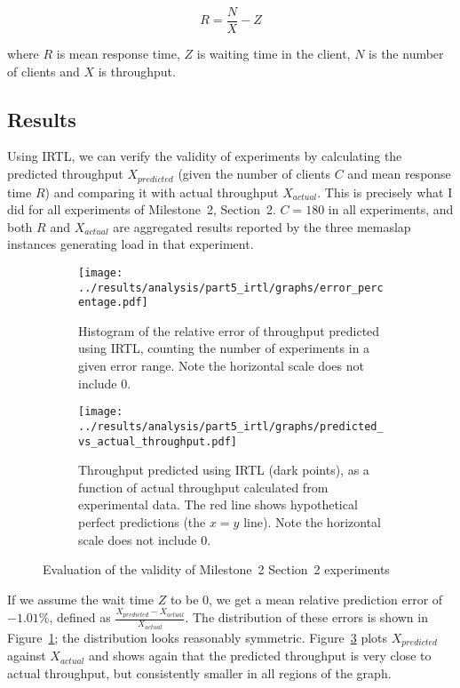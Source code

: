 \documentclass[11pt]{article}
\begin{document}
$$R = \frac{N}{X} - Z$$

where $R$ is mean response time, $Z$ is waiting time in the client, $N$ is the number of clients and $X$ is throughput.

\subsection{Results}

Using IRTL, we can verify the validity of experiments by calculating the predicted throughput $X_{predicted}$ (given the number of clients $C$ and mean response time $R$) and comparing it with actual throughput $X_{actual}$. This is precisely what I did for all experiments of Milestone~2, Section~2. $C=180$ in all experiments, and both $R$ and $X_{actual}$ are aggregated results reported by the three memaslap instances generating load in that experiment.

\begin{figure}[h]
\centering
\begin{subfigure}[t]{0.49\textwidth}
\texttt{[image: ../results/analysis/part5\_irtl/graphs/error\_percentage.pdf]}
\caption{Histogram of the relative error of throughput predicted using IRTL, counting the number of experiments in a given error range. Note the horizontal scale does not include 0.}
\label{fig:part5:error_percentage}
\end{subfigure}
\begin{subfigure}[t]{0.49\textwidth}
\texttt{[image: ../results/analysis/part5\_irtl/graphs/predicted\_vs\_actual\_throughput.pdf]}
\caption{Throughput predicted using IRTL (dark points), as a function of actual throughput calculated from experimental data. The red line shows hypothetical perfect predictions (the $x=y$ line). Note the horizontal scale does not include 0.}
\label{fig:part5:predicted_vs_actual}
\end{subfigure}
\caption{Evaluation of the validity of Milestone~2 Section~2 experiments}
\end{figure}

If we assume the wait time $Z$ to be 0, we get a mean relative prediction error of $-1.01\%$, defined as $\frac{X_{predicted}-X_{actual}}{X_{actual}}$. The distribution of these errors is shown in Figure~\ref{fig:part5:error_percentage}; the distribution looks reasonably symmetric. Figure~\ref{fig:part5:predicted_vs_actual} plots $X_{predicted}$ against $X_{actual}$ and shows again that the predicted throughput is very close to actual throughput, but consistently smaller in all regions of the graph.
\end{document}
